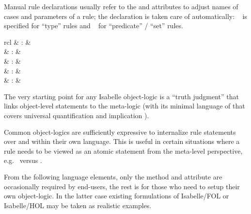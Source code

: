 \begin{isabellebody}
\begin{isamarkuptext}
\begin{descr}
  Manual rule declarations usually refer to the \mbox{} and \mbox{} attributes to adjust names of
  cases and parameters of a rule; the \mbox{}
  declaration is taken care of automatically: \mbox{}~ is specified for ``type'' rules and \mbox{}~ for ``predicate'' / ``set'' rules.

  \end{descr}%
\end{isamarkuptext}%
\isamarkuptrue%
%
\isamarkuptrue%
%
\begin{isamarkuptext}%
\begin{matharray}{rcl}
    \mbox{} & : &  \\
    \mbox{} & : & \isarmeth \\
    \mbox{} & : & \isaratt \\
    \mbox{} & : & \isaratt \\
    \mbox{} & : & \isaratt \\
  \end{matharray}

  The very starting point for any Isabelle object-logic is a ``truth
  judgment'' that links object-level statements to the meta-logic
  (with its minimal language of  that covers universal
  quantification \isa{{\isachardoublequote}{\isasymAnd}{\isachardoublequote}} and implication \isa{{\isachardoublequote}{\isasymLongrightarrow}{\isachardoublequote}}).

  Common object-logics are sufficiently expressive to internalize rule
  statements over \isa{{\isachardoublequote}{\isasymAnd}{\isachardoublequote}} and \isa{{\isachardoublequote}{\isasymLongrightarrow}{\isachardoublequote}} within their own
  language.  This is useful in certain situations where a rule needs
  to be viewed as an atomic statement from the meta-level perspective,
  e.g.\  versus .

  From the following language elements, only the \mbox{}
  method and \mbox{} attribute are occasionally
  required by end-users, the rest is for those who need to setup their
  own object-logic.  In the latter case existing formulations of
  Isabelle/FOL or Isabelle/HOL may be taken as realistic examples.


\end{isamarkuptext}
\end{isabellebody}
